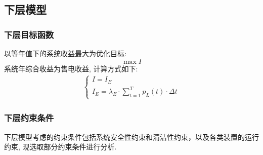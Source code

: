 \documentclass{article}
\begin{document}
\subsection{下层模型}
\subsubsection{下层目标函数}
以等年值下的系统收益最大为优化目标:
\begin{equation}
    \max I
\end{equation}
系统年综合收益为售电收益, 计算方式如下:
\begin{align}
    \begin{cases}
        I=I_E\\
        I_{E}=\lambda_{E}\cdot\sum_{t=1}^{T}p_{L}(t){\cdot}\Delta t
    \end{cases}
\end{align}

\subsubsection{下层约束条件}
下层模型考虑的约束条件包括系统安全性约束和清洁性约束，以及各类装置的运行约束, 现选取部分约束条件进行分析.
\end{document}
